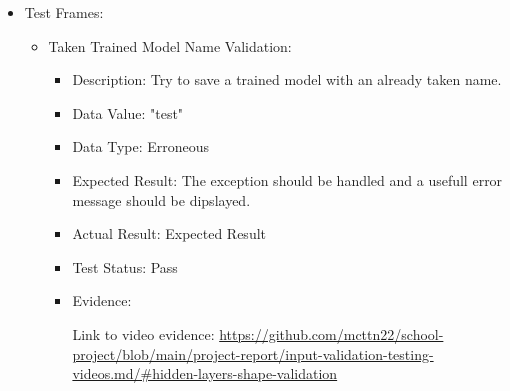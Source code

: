 \documentclass[./project-report/src/latex/project-report.tex]{subfiles}
\begin{document}
\begin{itemize}
    \item Test Frames:
    \begin{itemize}
        \item Taken Trained Model Name Validation:
            \begin{itemize}
                \item Description: Try to save a trained model with an already taken name.
                \item Data Value: "test"
                \item Data Type: Erroneous
                \item Expected Result: The exception should be handled and a usefull error message should be dipslayed.
                \item Actual Result: Expected Result
                \item Test Status: Pass
                \item Evidence:
                    \begin{figure}[h!]
                    \centering
                    \end{figure}

                    Link to video evidence: \url{https://github.com/mcttn22/school-project/blob/main/project-report/input-validation-testing-videos.md/#hidden-layers-shape-validation}
            \end{itemize}

        \pagebreak
        

\end{itemize}
\end{itemize}
\end{document}
